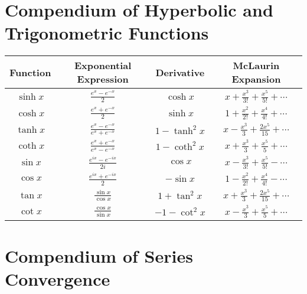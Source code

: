 \documentclass{article}
\begin{document}
\newpage
\section{Compendium of Hyperbolic and Trigonometric Functions}

\begin{center}
    \begin{tabular}{|c|c|c|c|}
        \hline
        \textbf{Function} & \textbf{Exponential Expression}     & \textbf{Derivative} & \textbf{McLaurin Expansion}                    \\
        \hline
        $\sinh{x}$        & $\frac{e^x - e^{-x}}{2}$            & $\cosh{x}$          & $x + \frac{x^3}{3!} + \frac{x^5}{5!} + \cdots$ \\
        \hline
        $\cosh{x}$        & $\frac{e^x + e^{-x}}{2}$            & $\sinh{x}$          & $1 + \frac{x^2}{2!} + \frac{x^4}{4!} + \cdots$ \\
        \hline
        $\tanh{x}$        & $\frac{e^x - e^{-x}}{e^x + e^{-x}}$ & $1 - \tanh^2{x}$    & $x - \frac{x^3}{3} + \frac{2x^5}{15} + \cdots$ \\
        \hline
        $\coth{x}$        & $\frac{e^x + e^{-x}}{e^x - e^{-x}}$ & $1 - \coth^2{x}$    & $x + \frac{x^3}{3} + \frac{x^5}{5} + \cdots$   \\
        \hline
        $\sin{x}$         & $\frac{e^{ix} - e^{-ix}}{2i}$       & $\cos{x}$           & $x - \frac{x^3}{3!} + \frac{x^5}{5!} - \cdots$ \\
        \hline
        $\cos{x}$         & $\frac{e^{ix} + e^{-ix}}{2}$        & $-\sin{x}$          & $1 - \frac{x^2}{2!} + \frac{x^4}{4!} - \cdots$ \\
        \hline
        $\tan{x}$         & $\frac{\sin{x}}{\cos{x}}$           & $1 + \tan^2{x}$     & $x + \frac{x^3}{3} + \frac{2x^5}{15} + \cdots$ \\
        \hline
        $\cot{x}$         & $\frac{\cos{x}}{\sin{x}}$           & $-1 - \cot^2{x}$    & $x - \frac{x^3}{3} + \frac{x^5}{5} + \cdots$   \\
        \hline
    \end{tabular}
\end{center}

\section{Compendium of Series Convergence}
\end{document}

